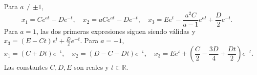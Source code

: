 Para \(a\ne\pm1\),
\[x_1=Ce^{at}+De^{-t},\quad x_2=aCe^{at}-De^{-t},\quad
x_3=Ee^t-\frac{a^2C}{a-1}e^{at}+\frac D2e^{-t}.\]
Para \(a=1\), las dos primeras expresiones siguen siendo válidas y
\(x_3=(E-Ct)e^t+\tfrac D2e^{-t}\).
Para \(a=-1\),
\[x_1=(C+Dt)e^{-t},\quad x_2=(D-C-Dt)e^{-t},\quad
x_3=Ee^t+\left(\frac C2-\frac{3D}{4}+\frac{Dt}{2}\right)e^{-t}.\]
Las constantes \(C,D,E\) son reales y \(t\in\mathbb R\).
